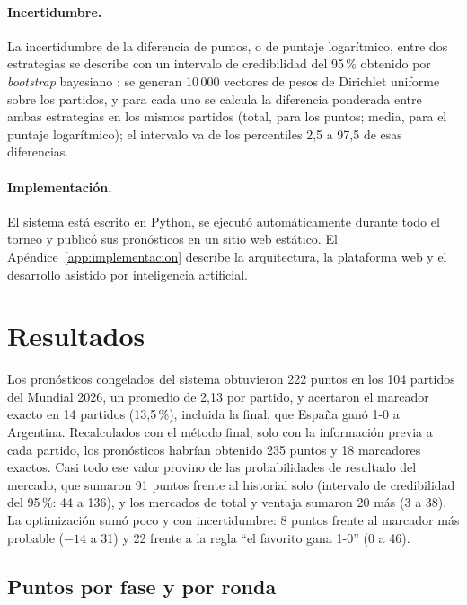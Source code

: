 \documentclass[12pt]{article}
\theoremstyle{plain}
\theoremstyle{remark}
\begin{document}
\paragraph{Incertidumbre.}
La incertidumbre de la diferencia de puntos, o de puntaje
logarítmico, entre dos estrategias se describe con un intervalo de
credibilidad del 95\,\% obtenido por \textit{bootstrap} bayesiano
\citep{rubin1981}: se generan 10\,000 vectores de pesos de Dirichlet
uniforme sobre los partidos, y para cada uno se calcula la diferencia
ponderada entre ambas estrategias en los mismos partidos (total, para
los puntos; media, para el puntaje logarítmico); el intervalo va de
los percentiles 2,5 a 97,5 de esas diferencias.

\paragraph{Implementación.}
El sistema está escrito en Python, se ejecutó automáticamente durante
todo el torneo y publicó sus pronósticos en un sitio web estático.
El Apéndice~\ref{app:implementacion} describe la arquitectura, la
plataforma web y el desarrollo asistido por inteligencia artificial.

\section{Resultados}
\label{sec:resultados}

Los pronósticos congelados del sistema obtuvieron 222 puntos en los
104 partidos del Mundial 2026, un promedio de 2,13 por partido, y
acertaron el marcador exacto en 14 partidos (13,5\,\%), incluida la
final, que España ganó 1-0 a Argentina.
Recalculados con el método final, solo con la información previa a
cada partido, los pronósticos habrían obtenido 235 puntos y 18
marcadores exactos.
Casi todo ese valor provino de las probabilidades de resultado del
mercado, que sumaron 91 puntos frente al historial solo (intervalo de
credibilidad del 95\,\%: 44 a 136), y los mercados de total y ventaja
sumaron 20 más (3 a 38).
La optimización sumó poco y con incertidumbre: 8 puntos frente al
marcador más probable ($-14$ a 31) y 22 frente a la regla ``el
favorito gana 1-0'' (0 a 46).

\FloatBarrier
\subsection{Puntos por fase y por ronda}
\label{sec:puntos}
\end{document}
